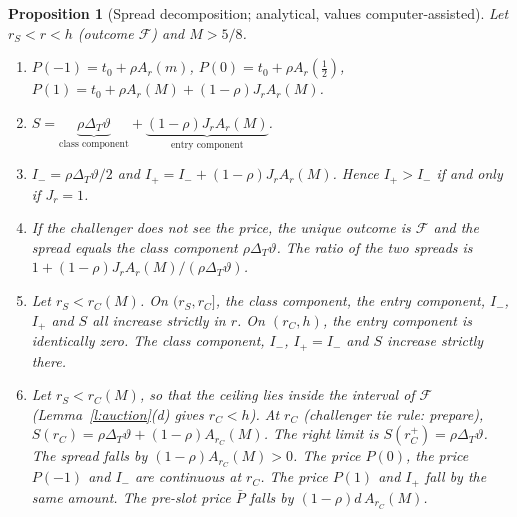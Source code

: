 \documentclass[12pt]{article}
\newtheorem{proposition}{Proposition}
\theoremstyle{definition}
\begin{document}
\begin{proposition}[Spread decomposition; analytical, values computer-assisted]\label{p:spread}
Let $r_S<r<h$ (outcome $\mathcal F$) and $M>5/8$.
\begin{enumerate}[label=(\roman*)]
\item $P(-1)=t_0+\rho A_r(m)$, $P(0)=t_0+\rho A_r(\tfrac12)$, $P(1)=t_0+\rho A_r(M)+(1-\rho)J_rA_r(M)$.
\item $S=\underbrace{\rho\Delta_T\vartheta}_{\text{class component}}+\underbrace{(1-\rho)J_rA_r(M)}_{\text{entry component}}$.
\item $I_-=\rho\Delta_T\vartheta/2$ and $I_+=I_-+(1-\rho)J_rA_r(M)$. Hence $I_+>I_-$ if and only if $J_r=1$.
\item If the challenger does not see the price, the unique outcome is $\mathcal F$ and the spread equals the class component $\rho\Delta_T\vartheta$. The ratio of the two spreads is $1+(1-\rho)J_rA_r(M)/(\rho\Delta_T\vartheta)$.
\item Let $r_S<r_C(M)$. On $(r_S,r_C]$, the class component, the entry component, $I_-$, $I_+$ and $S$ all increase strictly in $r$.
On $(r_C,h)$, the entry component is identically zero. The class component, $I_-$, $I_+=I_-$ and $S$ increase strictly there.
\item Let $r_S<r_C(M)$, so that the ceiling lies inside the interval of $\mathcal F$ (Lemma~\ref{l:auction}(d) gives $r_C<h$). At $r_C$ (challenger tie rule: prepare), $S(r_C)=\rho\Delta_T\vartheta+(1-\rho)A_{r_C}(M)$. The right limit is $S(r_C^+)=\rho\Delta_T\vartheta$. The spread falls by $(1-\rho)A_{r_C}(M)>0$. The price $P(0)$, the price $P(-1)$ and $I_-$ are continuous at $r_C$. The price $P(1)$ and $I_+$ fall by the same amount. The pre-slot price $\bar P$ falls by $(1-\rho)d\,A_{r_C}(M)$.
\end{enumerate}
\end{proposition}
\end{document}

